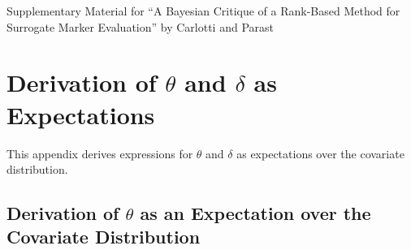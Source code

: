 \documentclass[referee,usenatbib]{biom}
\begin{document}
\setlength\parindent{15pt} 

  \begin{center}
    \LARGE{Supplementary Material for ``A Bayesian Critique of a Rank-Based Method for
    Surrogate Marker Evaluation'' by Carlotti and Parast}
\end{center}
\clearpage
\thispagestyle{empty}

\clearpage
\setcounter{page}{1}
\setcounter{section}{0}
\renewcommand{\thesection}{Web Appendix~\Alph{section}}

\setcounter{table}{0}
\renewcommand{\thetable}{A\arabic{table}}
\setcounter{figure}{0}
\renewcommand{\thefigure}{A\arabic{figure}}
\renewcommand{\theequation}{A.\arabic{equation}}

\allowdisplaybreaks


\section{Derivation of \texorpdfstring{\(\theta\)}{theta} and \texorpdfstring{\(\delta\)}{delta} as Expectations}
\label{app:derivation_theta_delta}

This appendix derives expressions for \(\theta\) and \(\delta\) as expectations over the covariate distribution. 

\subsection{Derivation of \texorpdfstring{\(\theta\)}{theta} as an Expectation over the Covariate Distribution}
\label{app:derivation_theta}
\end{document}
